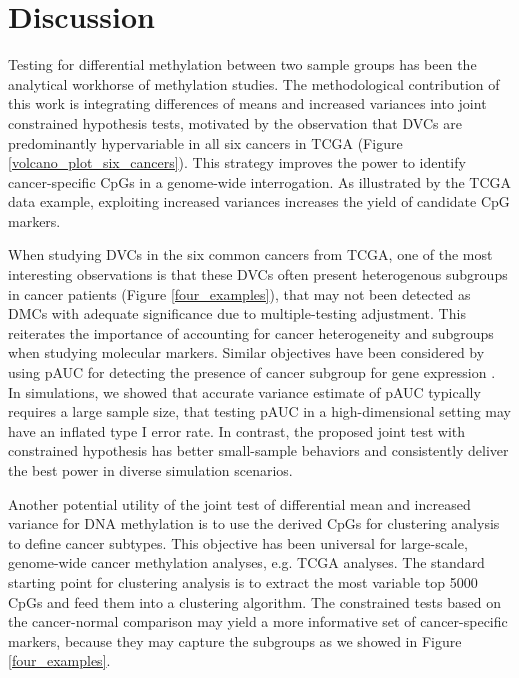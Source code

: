 \documentclass{statsoc}
\begin{document}
\section{Discussion}
\label{sec4}

Testing for differential methylation between two sample groups has been the analytical workhorse of methylation studies. The methodological contribution of this work is integrating differences of means and increased variances into joint constrained hypothesis tests, motivated by the observation that DVCs are predominantly hypervariable in all six cancers in TCGA (Figure \ref{volcano_plot_six_cancers}). This strategy improves the power to identify cancer-specific CpGs in a genome-wide interrogation. As illustrated by the TCGA data example, exploiting increased variances increases the yield of candidate CpG markers.

When studying DVCs in the six common cancers from TCGA, one of the most interesting observations is that these DVCs often present heterogenous subgroups in cancer patients (Figure \ref{four_examples}), that may not been detected as DMCs with adequate significance due to multiple-testing adjustment. This reiterates the importance of accounting for cancer heterogeneity and subgroups when studying molecular markers. Similar objectives have been considered by using pAUC for detecting the presence of cancer subgroup for gene expression \citep{Pepe2003}. In simulations, we showed that accurate variance estimate of pAUC typically requires a large sample size, that testing pAUC in a high-dimensional setting may have an inflated type I error rate. In contrast, the proposed joint test with constrained hypothesis has better small-sample behaviors and consistently deliver the best power in diverse simulation scenarios.




Another potential utility of the joint test of differential mean and increased variance for DNA methylation is to use the derived CpGs for clustering analysis to define cancer subtypes. This objective has been universal for large-scale, genome-wide cancer methylation analyses, e.g. TCGA analyses. The standard starting point for clustering analysis is to extract the most variable top 5000 CpGs and feed them into a clustering algorithm. The constrained tests based on the cancer-normal comparison may yield a more informative set of cancer-specific markers, because they may capture the subgroups as we showed in Figure \ref{four_examples}.
\end{document}
